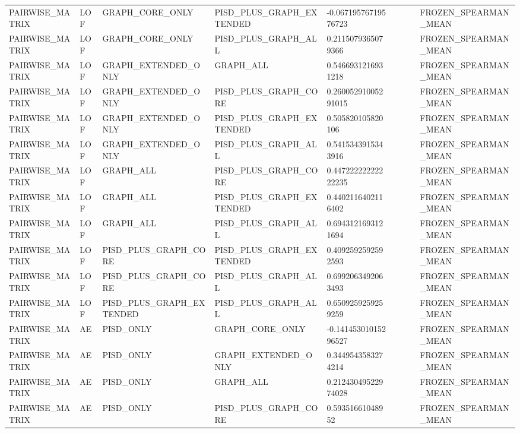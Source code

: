 \begin{longtable}{lllllllll}
PAIRWISE\_MATRIX & LOF & GRAPH\_CORE\_ONLY & PISD\_PLUS\_GRAPH\_EXTENDED & -0.06719576719576723 &  &  &  & FROZEN\_SPEARMAN\_MEAN \\
PAIRWISE\_MATRIX & LOF & GRAPH\_CORE\_ONLY & PISD\_PLUS\_GRAPH\_ALL & 0.2115079365079366 &  &  &  & FROZEN\_SPEARMAN\_MEAN \\
PAIRWISE\_MATRIX & LOF & GRAPH\_EXTENDED\_ONLY & GRAPH\_ALL & 0.5466931216931218 &  &  &  & FROZEN\_SPEARMAN\_MEAN \\
PAIRWISE\_MATRIX & LOF & GRAPH\_EXTENDED\_ONLY & PISD\_PLUS\_GRAPH\_CORE & 0.26005291005291015 &  &  &  & FROZEN\_SPEARMAN\_MEAN \\
PAIRWISE\_MATRIX & LOF & GRAPH\_EXTENDED\_ONLY & PISD\_PLUS\_GRAPH\_EXTENDED & 0.505820105820106 &  &  &  & FROZEN\_SPEARMAN\_MEAN \\
PAIRWISE\_MATRIX & LOF & GRAPH\_EXTENDED\_ONLY & PISD\_PLUS\_GRAPH\_ALL & 0.5415343915343916 &  &  &  & FROZEN\_SPEARMAN\_MEAN \\
PAIRWISE\_MATRIX & LOF & GRAPH\_ALL & PISD\_PLUS\_GRAPH\_CORE & 0.44722222222222235 &  &  &  & FROZEN\_SPEARMAN\_MEAN \\
PAIRWISE\_MATRIX & LOF & GRAPH\_ALL & PISD\_PLUS\_GRAPH\_EXTENDED & 0.4402116402116402 &  &  &  & FROZEN\_SPEARMAN\_MEAN \\
PAIRWISE\_MATRIX & LOF & GRAPH\_ALL & PISD\_PLUS\_GRAPH\_ALL & 0.6943121693121694 &  &  &  & FROZEN\_SPEARMAN\_MEAN \\
PAIRWISE\_MATRIX & LOF & PISD\_PLUS\_GRAPH\_CORE & PISD\_PLUS\_GRAPH\_EXTENDED & 0.4092592592592593 &  &  &  & FROZEN\_SPEARMAN\_MEAN \\
PAIRWISE\_MATRIX & LOF & PISD\_PLUS\_GRAPH\_CORE & PISD\_PLUS\_GRAPH\_ALL & 0.6992063492063493 &  &  &  & FROZEN\_SPEARMAN\_MEAN \\
PAIRWISE\_MATRIX & LOF & PISD\_PLUS\_GRAPH\_EXTENDED & PISD\_PLUS\_GRAPH\_ALL & 0.6509259259259259 &  &  &  & FROZEN\_SPEARMAN\_MEAN \\
PAIRWISE\_MATRIX & AE & PISD\_ONLY & GRAPH\_CORE\_ONLY & -0.14145301015296527 &  &  &  & FROZEN\_SPEARMAN\_MEAN \\
PAIRWISE\_MATRIX & AE & PISD\_ONLY & GRAPH\_EXTENDED\_ONLY & 0.3449543583274214 &  &  &  & FROZEN\_SPEARMAN\_MEAN \\
PAIRWISE\_MATRIX & AE & PISD\_ONLY & GRAPH\_ALL & 0.21243049522974028 &  &  &  & FROZEN\_SPEARMAN\_MEAN \\
PAIRWISE\_MATRIX & AE & PISD\_ONLY & PISD\_PLUS\_GRAPH\_CORE & 0.59351661048952 &  &  &  & FROZEN\_SPEARMAN\_MEAN \\

\end{longtable}
